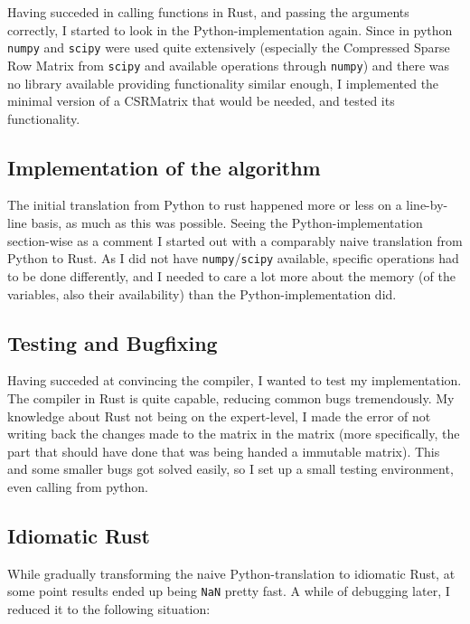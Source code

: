 Having succeded in calling functions in Rust, and passing the arguments
correctly, I started to look in the Python-implementation again. Since in
python \verb|numpy| and \verb|scipy| were used quite extensively (especially
the Compressed Sparse Row Matrix from \verb|scipy| and available operations
through \verb|numpy|) and there was no library available providing
functionality similar enough, I implemented the minimal version of a CSRMatrix
that would be needed, and tested its functionality.


\subsection{Implementation of the algorithm}


The initial translation from Python to rust happened more or less on a
line-by-line basis, as much as this was possible. Seeing the
Python-implementation section-wise as a comment I started out with a comparably
naive translation from Python to Rust. As I did not have
\verb|numpy|/\verb|scipy| available, specific operations had to be done
differently, and I needed to care a lot more about the memory (of the
variables, also their availability) than the Python-implementation did.


\subsection{Testing and Bugfixing}


Having succeded at convincing the compiler, I wanted to test my implementation.
The compiler in Rust is quite capable, reducing common bugs tremendously.
My knowledge about Rust not being on the expert-level, I made the error of not
writing back the changes made to the matrix in the matrix (more specifically,
the part that should have done that was being handed a immutable matrix). This
and some smaller bugs got solved easily, so I set up a small testing
environment, even calling from python.


\subsection{Idiomatic Rust}


While gradually transforming the naive Python-translation to idiomatic Rust, at
some point results ended up being \verb|NaN| pretty fast. A while of
debugging later, I reduced it to the following situation:

